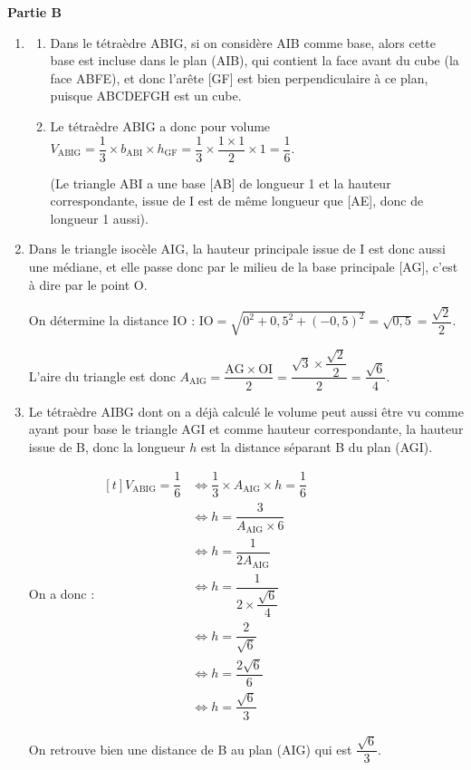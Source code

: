 \documentclass[10pt]{article}
\begin{document}
		\textbf{Partie B}
		\begin{enumerate}
			\item \begin{enumerate}
				\item Dans le tétraèdre ABIG, si on considère AIB comme base, alors cette base est incluse dans le plan (AIB), qui contient la face avant du cube (la face ABFE), et donc l'arête [GF] est bien perpendiculaire à ce plan, puisque ABCDEFGH est un cube.
				\item Le tétraèdre ABIG a donc pour volume $V_{\mathrm{ABIG}} = \dfrac{1}{3} \times b_{\mathrm{ABI}} \times h_{\mathrm{GF}} = \dfrac{1}{3} \times \dfrac{1 \times 1}{2} \times 1 = \dfrac{1}{6}$.

(Le triangle ABI a une base [AB] de longueur 1 et la hauteur correspondante, issue de I est de même longueur que [AE], donc de longueur 1 aussi).
	\end{enumerate}

\item Dans le triangle isocèle AIG, la hauteur principale issue de I est donc aussi une médiane, et elle passe donc par le milieu de la base principale [AG], c'est à dire par le point O.

On détermine la distance IO : $\mathrm{IO} = \sqrt{0^2 + 0,5^2 + (-0,5)^2} = \sqrt{0,5} = \dfrac{\sqrt{2}}{2}$.

L'aire du triangle est donc $A_\mathrm{AIG} = \dfrac{\mathrm{AG} \times \mathrm{OI}}{2} = \dfrac{\sqrt{3}\times \dfrac{\sqrt{2}}{2}}{2} = \dfrac{\sqrt{6}}{4}$.

\item Le tétraèdre AIBG dont on a déjà calculé le volume peut aussi être vu comme ayant pour base le triangle AGI et comme hauteur correspondante, la hauteur issue de B, donc la longueur $h$ est la distance séparant B du plan (AGI).

On a donc : $\begin{aligned}[t] V_\mathrm{ABIG} = \dfrac{1}{6} &\iff \dfrac{1}{3}\times A_\mathrm{AIG} \times h = \dfrac{1}{6}\\
			&\iff h = \dfrac{3}{A_\mathrm{AIG}\times 6 }\\
			&\iff h = \dfrac{1}{2A_\mathrm{AIG}}\\
			&\iff h = \dfrac{1}{2\times \dfrac{\sqrt{6}}{4}}\\
			&\iff h = \dfrac{2}{\sqrt{6}}\\
			&\iff h = \dfrac{2\sqrt{6}}{6}\\
			&\iff h = \dfrac{\sqrt{6}}{3}
			\end{aligned}$

On retrouve bien une distance de B au plan (AIG) qui est $ \dfrac{\sqrt{6}}{3} $.
\end{enumerate}
\end{document}
